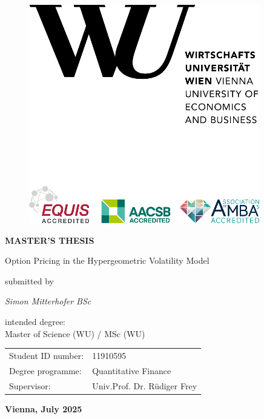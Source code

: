 \documentclass[a4paper,11pt]{article}
\begin{document}

\thispagestyle{empty}
\begin{figure}[h!]
    \raggedleft
    \includegraphics[scale=1]{figures/WULogo.png}
\end{figure}


\begin{center}
    \textbf{\huge MASTER’S THESIS} \\
    \vspace{1.5cm}

    \LARGE Option Pricing in the Hypergeometric Volatility Model \\
    \vspace{2.5cm}
    
    \normalsize submitted by \\
    \vspace{0.5cm}
    
    \textit{\Large Simon Mitterhofer BSc}
    \vspace{2cm}
    
    intended degree: \\
    \Large Master of Science (WU) / MSc (WU)
        \\
\vspace{1cm}
\normalsize

    \begin{tabular}{ll}
        Student ID number: & 11910595 \\
        Degree programme: & Quantitative Finance \\
        Supervisor: & Univ.Prof. Dr. Rüdiger Frey \\
    \end{tabular}
    \vspace{2cm}
    
    \textbf{Vienna, July 2025}
\end{center}
\end{document}
